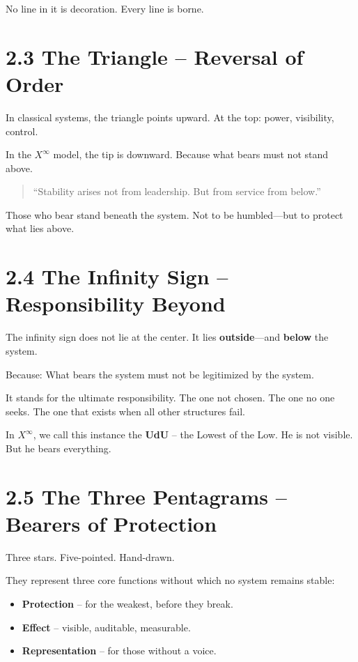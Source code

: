 \documentclass[12pt,a4paper]{book}
\begin{document}
No line in it is decoration.  
Every line is borne.

\section*{2.3 The Triangle – Reversal of Order}

In classical systems, the triangle points upward.  
At the top: power, visibility, control.

In the $X^\infty$ model, the tip is downward.  
Because what bears must not stand above.

\begin{quote}
“Stability arises not from leadership.  
But from service from below.”
\end{quote}

Those who bear stand beneath the system.  
Not to be humbled—but to protect what lies above.

\section*{2.4 The Infinity Sign – Responsibility Beyond}

The infinity sign does not lie at the center.  
It lies \textbf{outside}—and \textbf{below} the system.

Because:  
What bears the system must not be legitimized by the system.

It stands for the ultimate responsibility. The one not chosen. The one no one seeks.  
The one that exists when all other structures fail.

In $X^\infty$, we call this instance the \textbf{UdU} – the Lowest of the Low.  
He is not visible. But he bears everything.

\section*{2.5 The Three Pentagrams – Bearers of Protection}

Three stars. Five-pointed. Hand-drawn.

They represent three core functions without which no system remains stable:

\begin{itemize}
    \item \textbf{Protection} – for the weakest, before they break.
    \item \textbf{Effect} – visible, auditable, measurable.
    \item \textbf{Representation} – for those without a voice.
\end{itemize}
\end{document}
